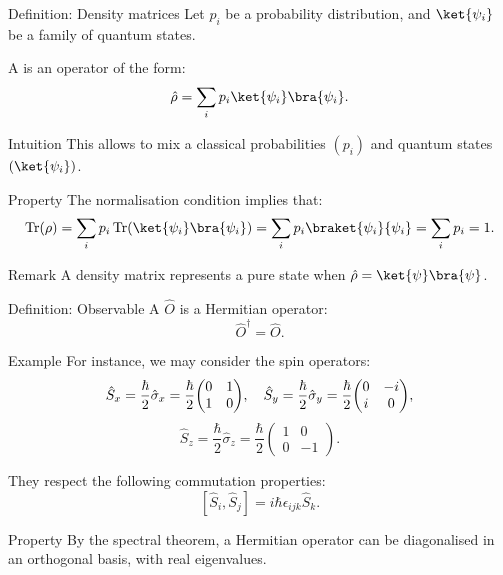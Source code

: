 \documentclass[a4paper]{article}
\begin{document}
\begin{parag}{Definition: Density matrices}
    Let $p_i$ be a probability distribution, and $\ket{\psi_i}$ be a family of quantum states.

    A  is an operator of the form: 
    \[\hat{\rho} = \sum_{i} p_i \ket{\psi_i}\bra{\psi_i}.\]

    \begin{subparag}{Intuition}
        This allows to mix a classical probabilities $\left(p_i\right)$ and quantum states $\left(\ket{\psi_i}\right)$.
    \end{subparag}

    \begin{subparag}{Property}
        The normalisation condition implies that: 
        \[\Tr\left(\rho\right) = \sum_{i} p_i \Tr\left(\ket{\psi_i} \bra{\psi_i}\right) = \sum_{i} p_i \braket{\psi_i}{\psi_i} = \sum_{i} p_i = 1.\]
    \end{subparag}

    \begin{subparag}{Remark}
        A density matrix represents a pure state when $\hat{\rho} = \ket{\psi}\bra{\psi}$.
    \end{subparag}
\end{parag}

\begin{parag}{Definition: Observable}
    A  $\hat{O}$ is a Hermitian operator: 
    \[\hat{O}^{\dagger} = \hat{O}.\]
    
    \begin{subparag}{Example}
        For instance, we may consider the spin operators: 
        \[\hat{S}_x = \frac{\hbar}{2} \hat{\sigma}_x = \frac{\hbar}{2} \begin{pmatrix} 0 & 1 \\ 1 & 0 \end{pmatrix}, \mathspace \hat{S}_y = \frac{\hbar}{2} \hat{\sigma}_y = \frac{\hbar}{2} \begin{pmatrix} 0 & -i \\ i & 0 \end{pmatrix},\]
        \[\hat{S}_z = \frac{\hbar}{2} \hat{\sigma}_z = \frac{\hbar}{2} \begin{pmatrix} 1 & 0 \\ 0 & -1\end{pmatrix}.\]

        They respect the following commutation properties: 
        \[\left[\hat{S}_i, \hat{S}_j\right] = i \hbar \epsilon_{ijk} \hat{S}_k.\]
    \end{subparag}

    \begin{subparag}{Property}
        By the spectral theorem, a Hermitian operator can be diagonalised in an orthogonal basis, with real eigenvalues.
    \end{subparag}
\end{parag}
\end{document}
